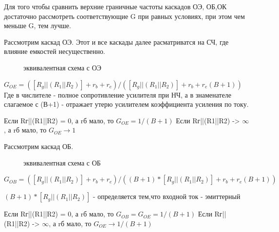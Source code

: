 \documentclass[12pt,a4paper]{article}
\begin{document}
Для  того чтобы сравнить верхние граничные частоты каскадов ОЭ, ОБ,ОК достаточно рассмотреть соответствующие G при равных условиях, при этом чем меньше G, тем лучше.

Рассмотрим каскад ОЭ.
Этот и все каскады далее расматриватся на СЧ, где влияние емкостей несущественно.
\begin{center}
        \begin{figure}[h!]
                \caption{эквивалентная схема с ОЭ}
                \label{EOE}
        \end{figure}
\end{center}

$G_\textit{OE} = ([R_g ||(R_1||R_2)] + r_b+r_e)/([R_g ||(R_1||R_2)] + r_b+r_e(B+1))$
Где в числителе - полное сопротивление усилителя при НЧ, а в знаменателе слагаемое с (В+1) - отражает утерю усилителем коэффициента усиления по току.

Если Rг||(R1||R2) = 0, а rб мало, то $G_\textit{OE} =1/(B+1)$
Если Rг||(R1||R2) -> $\infty$, а rб мало, то $G_\textit{OE} \longrightarrow 1$


Рассмотрим каскад ОБ.

\begin{center}
        \begin{figure}[h!]
                \caption{эквивалентная схема с ОБ}
                \label{EOB}
        \end{figure}
\end{center}

$G_\textit{OB} = ([R_g ||(R_1||R_2)] + r_b+r_e)/((B+1)*[R_g ||(R_1||R_2)] + r_b+r_e(B+1))$

$(B+1)*[R_g ||(R_1||R_2)]$ - определяется тем,что входной ток - эмиттерный

Если Rг||(R1||R2) = 0, а rб мало, то $G_\textit{OB}=G_\textit{OE} =1/(B+1)$
Если Rг||(R1||R2) -> $\infty$, а rб мало, то $G_\textit{OE} \longrightarrow 1/(B+1)$
\end{document}

